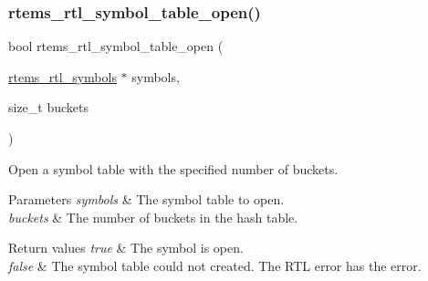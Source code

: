 \subsubsection{\texorpdfstring{rtems\_rtl\_symbol\_table\_open()}{rtems\_rtl\_symbol\_table\_open()}}
{\footnotesize\ttfamily bool rtems\+\_\+rtl\+\_\+symbol\+\_\+table\+\_\+open (\begin{DoxyParamCaption}\item[{\mbox{\hyperlink{structrtems__rtl__symbols}{rtems\+\_\+rtl\+\_\+symbols}} $\ast$}]{symbols,  }\item[{size\+\_\+t}]{buckets }\end{DoxyParamCaption})}

Open a symbol table with the specified number of buckets.


\begin{DoxyParams}{Parameters}
{\em symbols} & The symbol table to open. \\
\hline
{\em buckets} & The number of buckets in the hash table. \\
\hline
\end{DoxyParams}

\begin{DoxyRetVals}{Return values}
{\em true} & The symbol is open. \\
\hline
{\em false} & The symbol table could not created. The R\+TL error has the error. \\
\hline
\end{DoxyRetVals}
